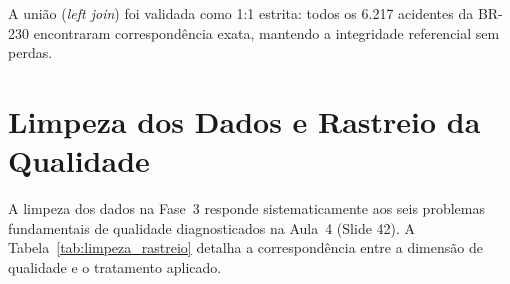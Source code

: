 \documentclass[11pt,a4paper]{article}
\begin{document}
A união (\textit{left join}) foi validada como 1:1 estrita: todos os 6.217 acidentes da BR-230 encontraram correspondência exata, mantendo a integridade referencial sem perdas.

\section{Limpeza dos Dados e Rastreio da Qualidade}

A limpeza dos dados na Fase~3 responde sistematicamente aos seis problemas fundamentais de qualidade diagnosticados na Aula~4 (Slide 42). A Tabela~\ref{tab:limpeza_rastreio} detalha a correspondência entre a dimensão de qualidade e o tratamento aplicado.
\end{document}
